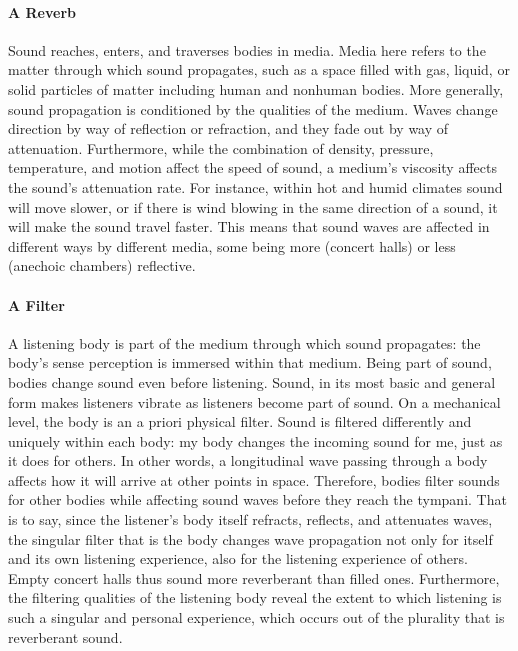 \paragraph{A Reverb}
Sound reaches, enters, and traverses bodies in media. Media here refers to the matter through which sound propagates, such as a space filled with gas, liquid, or solid particles of matter including human and nonhuman bodies. More generally, sound propagation is conditioned by the qualities of the medium. Waves change direction by way of reflection or refraction, and they fade out by way of attenuation. Furthermore, while the combination of density, pressure, temperature, and motion affect the speed of sound, a medium's viscosity affects the sound's attenuation rate. For instance, within hot and humid climates sound will move slower, or if there is wind blowing in the same direction of a sound, it will make the sound travel faster. This means that sound waves are affected in different ways by different media, some being more (concert halls) or less (anechoic chambers) reflective.

\paragraph{A Filter}
A listening body is part of the medium through which sound propagates: the body's sense perception is immersed within that medium. Being part of sound, bodies change sound even before listening. Sound, in its most basic and general form makes listeners vibrate as listeners become part of sound. On a mechanical level, the body is an a priori physical filter. Sound is filtered differently and uniquely within each body: my body changes the incoming sound for me, just as it does for others. In other words, a longitudinal wave passing through a body affects how it will arrive at other points in space. Therefore, bodies filter sounds for other bodies while affecting sound waves before they reach the tympani. That is to say, since the listener's body itself refracts, reflects, and attenuates waves, the singular filter that is the body changes wave propagation not only for itself and its own listening experience, also for the listening experience of others. Empty concert halls thus sound more reverberant than filled ones. Furthermore, the filtering qualities of the listening body reveal the extent to which listening is such a singular and personal experience, which occurs out of the plurality that is reverberant sound.

